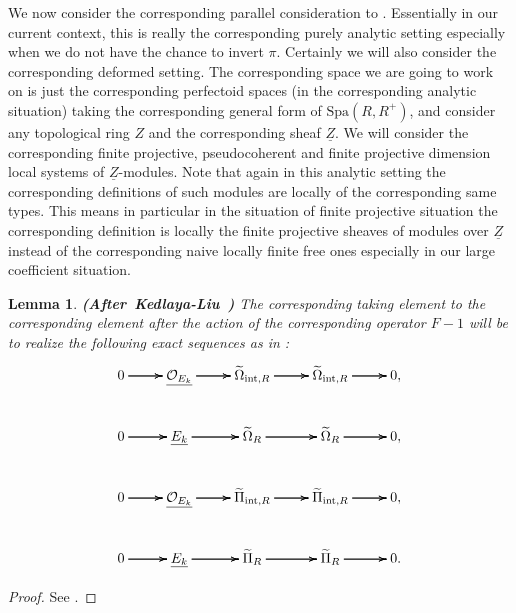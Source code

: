 \documentclass[12pt]{amsart}
\newtheorem{lemma}[theorem]{Lemma}
\theoremstyle{definition}
\numberwithin{equation}{section}
\begin{document}
\noindent We now consider the corresponding parallel consideration to \cite[Section 4.5]{KL2}. Essentially in our current context, this is really the corresponding purely analytic setting especially when we do not have the chance to invert $\pi$. Certainly we will also consider the corresponding deformed setting. The corresponding space we are going to work on is just the corresponding perfectoid spaces (in the corresponding analytic situation) taking the corresponding general form of $\mathrm{Spa}(R,R^+)$, and consider any topological ring $Z$ and the corresponding sheaf $\underline{Z}$. We will consider the corresponding finite projective, pseudocoherent and finite projective dimension local systems of $\underline{Z}$-modules. Note that again in this analytic setting the corresponding definitions of such modules are locally of the corresponding same types. This means in particular in the situation of finite projective situation the corresponding definition is locally the finite projective sheaves of modules over $\underline{Z}$ instead of the corresponding naive locally finite free ones especially in our large coefficient situation.


\begin{lemma} \mbox{\bf{(After Kedlaya-Liu \cite[Lemma 4.5.3]{KL2})}}
The corresponding taking element to the corresponding element after the action of the corresponding operator $F-1$ will be to realize the following exact sequences as in \cite[Lemma 4.5.3]{KL2}:
\[
\xymatrix@C+0pc@R+0pc{
0 \ar[r] \ar[r] \ar[r] &\underline{\mathcal{O}_{E_k}}  \ar[r] \ar[r] \ar[r] &\widetilde{\Omega}_{\mathrm{int},R} \ar[r] \ar[r] \ar[r] &\widetilde{\Omega}_{\mathrm{int},R} \ar[r] \ar[r] \ar[r] &0,\\
0 \ar[r] \ar[r] \ar[r] &\underline{{E}_{k}}  \ar[r] \ar[r] \ar[r] &\widetilde{\Omega}_{R} \ar[r] \ar[r] \ar[r] &\widetilde{\Omega}_{R} \ar[r] \ar[r] \ar[r] &0,\\
0 \ar[r] \ar[r] \ar[r] &\underline{\mathcal{O}_{E_k}}  \ar[r] \ar[r] \ar[r] &\widetilde{\Pi}_{\mathrm{int},R} \ar[r] \ar[r] \ar[r] &\widetilde{\Pi}_{\mathrm{int},R} \ar[r] \ar[r] \ar[r] &0,\\
0 \ar[r] \ar[r] \ar[r] &\underline{{E_k}}  \ar[r] \ar[r] \ar[r] &\widetilde{\Pi}_{R} \ar[r] \ar[r] \ar[r] &\widetilde{\Pi}_{R} \ar[r] \ar[r] \ar[r] &0.\\
}
\]	
\end{lemma}

\begin{proof}
See \cite[Lemma 4.5.3]{KL2}.	
\end{proof}
\end{document}
